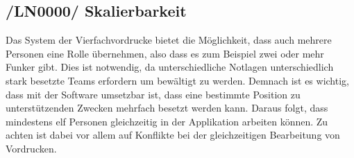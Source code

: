 \subsection{/LN0000/ Skalierbarkeit}
Das System der Vierfachvordrucke bietet die Möglichkeit, dass auch mehrere Personen eine Rolle übernehmen, also dass es zum Beispiel zwei oder mehr Funker gibt. Dies ist notwendig, da unterschiedliche Notlagen unterschiedlich stark besetzte Teams erfordern um bewältigt zu werden. Demnach ist es wichtig, dass mit der Software umsetzbar ist, dass eine bestimmte Position zu unterstützenden Zwecken mehrfach besetzt werden kann. Daraus folgt, dass mindestens elf Personen gleichzeitig in der Applikation arbeiten können. Zu achten ist dabei vor allem auf Konflikte bei der gleichzeitigen Bearbeitung von Vordrucken.